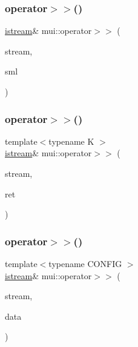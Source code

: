 \mbox{\label{namespacemui_a53fe89815786e8278b7b5507651cade9}} 
\subsubsection{\texorpdfstring{operator$>$$>$()}{operator>>()}\hspace{0.1cm}{\footnotesize\ttfamily [10/20]}}
{\footnotesize\ttfamily \hyperlink{classmui_1_1istream}{istream}\& mui\+::operator$>$$>$ (\begin{DoxyParamCaption}\item[{\hyperlink{classmui_1_1istream}{istream} \&}]{stream,  }\item[{\hyperlink{structmui_1_1smalluint}{smalluint} \&}]{sml }\end{DoxyParamCaption})\hspace{0.3cm}{\ttfamily [inline]}}

\mbox{\label{namespacemui_a17c76f489d40340e045de4a883cde952}} 
\subsubsection{\texorpdfstring{operator$>$$>$()}{operator>>()}\hspace{0.1cm}{\footnotesize\ttfamily [11/20]}}
{\footnotesize\ttfamily template$<$typename K $>$ \\
\hyperlink{classmui_1_1istream}{istream}\& mui\+::operator$>$$>$ (\begin{DoxyParamCaption}\item[{\hyperlink{classmui_1_1istream}{istream} \&}]{stream,  }\item[{std\+::unordered\+\_\+set$<$ K $>$ \&}]{ret }\end{DoxyParamCaption})\hspace{0.3cm}{\ttfamily [inline]}}

\mbox{\label{namespacemui_a8800be884714254506a106cdba988528}} 
\subsubsection{\texorpdfstring{operator$>$$>$()}{operator>>()}\hspace{0.1cm}{\footnotesize\ttfamily [12/20]}}
{\footnotesize\ttfamily template$<$typename C\+O\+N\+F\+IG $>$ \\
\hyperlink{classmui_1_1istream}{istream}\& mui\+::operator$>$$>$ (\begin{DoxyParamCaption}\item[{\hyperlink{classmui_1_1istream}{istream} \&}]{stream,  }\item[{\hyperlink{classmui_1_1span}{span}$<$ C\+O\+N\+F\+IG $>$ \&}]{data }\end{DoxyParamCaption})}

